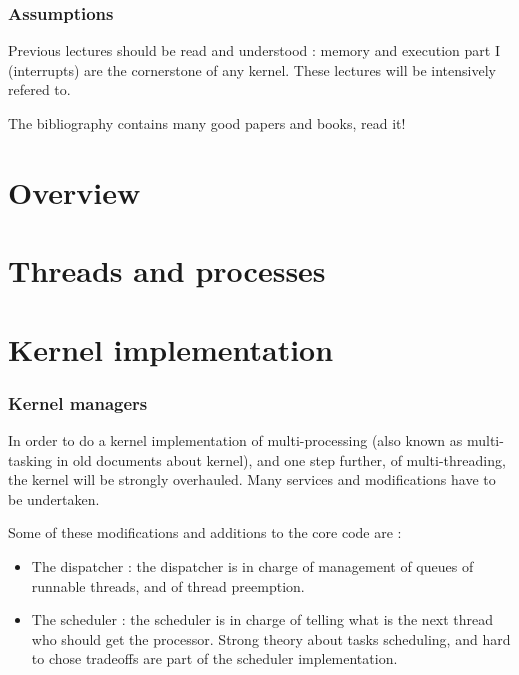 
\begin{frame}
  \frametitle{Assumptions}

 Previous lectures should be read and understood : memory and execution part I (interrupts) are the cornerstone of any kernel. These lectures will be intensively refered to.

\-

The bibliography contains many good papers and books, read it!

\end{frame}



%
%

\section{Overview}

\section{Threads and processes}


%
%

\section{Kernel implementation}


\begin{frame}
  \frametitle{Kernel managers}

In order to do a kernel implementation of multi-processing (also known as multi-tasking in old documents about kernel), and one step further, of multi-threading, the kernel will be strongly overhauled. Many services and modifications have to be undertaken.

\-

Some of these modifications and additions to the core code are :

\begin{itemize}
\item
The dispatcher : the dispatcher is in charge of management of queues of runnable threads, and of thread preemption.

\item
The scheduler : the scheduler is in charge of telling what is the next thread who should get the processor. Strong theory about tasks scheduling, and hard to chose tradeoffs are part of the scheduler implementation.

\end{itemize}

\end{frame}


